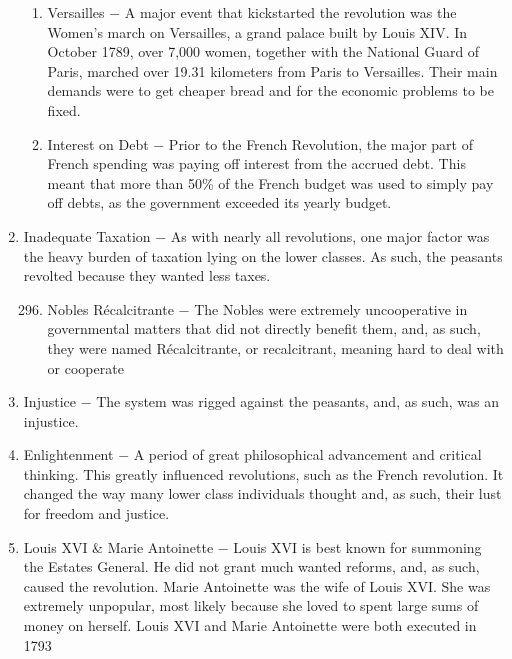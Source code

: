 \documentclass[12pt]{article}
\begin{document}
\begin{enumerate}
\begin{enumerate}[label=\arabic{*}.]
\item Versailles $-$ A major event that kickstarted the revolution was the Women's march on Versailles, a grand palace built by Louis XIV. In October 1789, over 7,000 women, together with the National Guard of Paris, marched over 19.31 kilometers from Paris to Versailles. Their main demands were to get cheaper bread and for the economic problems to be fixed.

\item Interest on Debt $-$ Prior to the French Revolution, the major part of French spending was paying off interest from the accrued debt. This meant that more than 50\% of the French budget was used to simply pay off debts, as the government exceeded its yearly budget.

\end{enumerate}
\setcounter{enumi}{294}

\item Inadequate Taxation $-$ As with nearly all revolutions, one major factor was the heavy burden of taxation lying on the lower classes. As such, the peasants revolted because they wanted less taxes.

\begin{enumerate}[label=\arabic{*}.]
\setcounter{enumii}{295}

\item Nobles R\'ecalcitrante $-$ The Nobles were extremely uncooperative in governmental matters that did not directly benefit them, and, as such, they were named R\'ecalcitrante, or recalcitrant, meaning hard to deal with or cooperate

\end{enumerate}
\setcounter{enumi}{296}

\item Injustice $-$ The system was rigged against the peasants, and, as such, was an injustice.

\item Enlightenment $-$ A period of great philosophical advancement and critical thinking. This greatly influenced revolutions, such as the French revolution. It changed the way many lower class individuals thought and, as such, their lust for freedom and justice.

\item Louis XVI \& Marie Antoinette $-$ Louis XVI is best known for summoning the Estates General. He did not grant much wanted reforms, and, as such, caused the revolution. Marie Antoinette was the wife of Louis XVI. She was extremely unpopular, most likely because she loved to spent large sums of money on herself. Louis XVI and Marie Antoinette were both executed in 1793


\end{enumerate}
\end{document}
